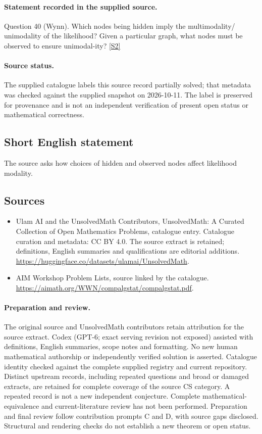\documentclass[11pt]{article}
\begin{document}
\paragraph{Statement recorded in the supplied source.}
Question 40 (Wynn). Which nodes being hidden imply the multimodality/ unimodality of the likelihood? Given a particular graph, what nodes must be observed to ensure unimodal-ity? \href{https://aimath.org/WWN/compalgstat/compalgstat.pdf}{[S2]}
\paragraph{Source status.}
The supplied catalogue labels this source record partially solved; that metadata was checked against the supplied snapshot on 2026-10-11. The label is preserved for provenance and is not an independent verification of present open status or mathematical correctness.
\subsection{Short English statement}
The source asks how choices of hidden and observed nodes affect likelihood modality.
\subsection{Sources}
\begin{itemize}
\item[S1] Ulam AI and the UnsolvedMath Contributors, UnsolvedMath: A Curated Collection of Open Mathematics Problems, catalogue entry. Catalogue curation and metadata: CC BY 4.0. The source extract is retained; definitions, English summaries and qualifications are editorial additions.
\url{https://huggingface.co/datasets/ulamai/UnsolvedMath}.
\item[S2] AIM Workshop Problem Lists, source linked by the catalogue.
\url{https://aimath.org/WWN/compalgstat/compalgstat.pdf}.
\end{itemize}
\paragraph{Preparation and review.}
The original source and UnsolvedMath contributors retain attribution for the source extract. Codex (GPT-6; exact serving revision not exposed) assisted with definitions, English summaries, scope notes and formatting. No new human mathematical authorship or independently verified solution is asserted. Catalogue identity checked against the complete supplied registry and current repository. Distinct upstream records, including repeated questions and broad or damaged extracts, are retained for complete coverage of the source CS category. A repeated record is not a new independent conjecture. Complete mathematical-equivalence and current-literature review has not been performed. Preparation and final review follow contribution prompts C and D, with source gaps disclosed. Structural and rendering checks do not establish a new theorem or open status.
\label{end:statement}
\end{document}
